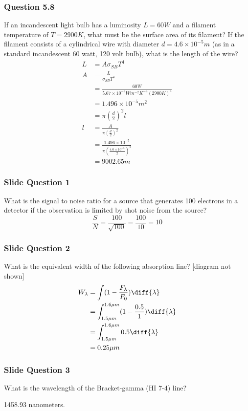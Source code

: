 \documentclass{math}
\begin{document}
\subsubsection*{Question 5.8}
If an incandescent light bulb has a luminosity \( L = 60W \) and a filament
temperature of \( T = 2900K \), what must be the surface area of its filament?
If the filament consists of a cylindrical wire with diameter
\( d = 4.6\times10^{-5}m \) (as in a standard incandescent 60 watt, 120 volt
bulb), what is the length of the wire?
\begin{align*}
  L &= A\sigma_{SB}T^4 \\
  A &= \frac{L}{\sigma_{SB}T^4} \\
  &= \frac{60W}{5.67\times10^{-8}Wm^{-2}K^{-4}(2900K)^4} \\
  &= 1.496\times10^{-5}m^2 \\
  &= \pi(\frac{d}{2})^2l \\
  l &= \frac{A}{\pi(\frac{d}{2})^2} \\
  &= \frac{1.496\times10^{-5}}{\pi(\frac{4.6\times10^{-5}}{2})^2} \\
  &= 9002.65m
\end{align*}

\subsubsection*{Slide Question 1}
What is the signal to noise ratio for a source that generates 100 electrons in
a detector if the observation is limited by shot noise from the source?
\[ \frac{S}{N} = \frac{100}{\sqrt{100}} = \frac{100}{10} = 10 \]

\subsubsection*{Slide Question 2}
What is the equivalent width of the following absorption line?
[diagram not shown]
\begin{align*}
  W_{\lambda} &= \int(1-\frac{F_{\lambda}}{F_0})\diff{\lambda} \\
  &= \int_{1.5\mu m}^{1.6\mu m}(1-\frac{0.5}{1})\diff{\lambda} \\
  &= \int_{1.5\mu m}^{1.6\mu m}0.5\diff{\lambda} \\
  &= 0.25\mu m
\end{align*}

\subsubsection*{Slide Question 3}
What is the wavelength of the Bracket-gamma (HI 7-4) line? \par
1458.93 nanometers.
\end{document}
